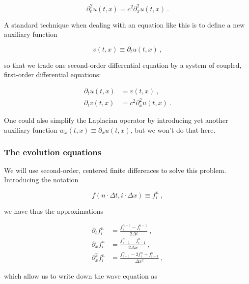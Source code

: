 \documentclass[a4paper,11pt]{article}
\begin{document}
\begin{equation}
\partial_{t}^{2}u(t,x) = c^{2}\partial_{x}^{2}u(t,x)\ .
\end{equation}

A standard technique when dealing with an equation like this is to define a new auxiliary function

\begin{equation}
v(t,x) \equiv \partial_{t}u(t,x)\ ,
\end{equation}

\noindent so that we trade one second-order differential equation by a system of coupled, first-order differential equations:

\begin{equation}
\begin{aligned}
\partial_{t}u(t,x) &= v(t,x)\ ,\\
\partial_{t}v(t,x) &= c^{2}\partial_{x}^{2}u(t,x)\ .
\end{aligned}
\end{equation}

\noindent One could also simplify the Laplacian operator by introducing yet another auxiliary function $w_{x}(t,x)\equiv\partial_{x}u(t,x)$, but we won't do that here.

\subsubsection{The evolution equations}

We will use second-order, centered finite differences to solve this problem. Introducing the notation

\begin{equation}
f\left(n\cdot\Delta t,i\cdot\Delta x\right) \equiv f^{n}_{i}\ ,
\end{equation}

\noindent we have thus the approximations

\begin{equation}
\begin{aligned}
\partial_{t}f^{n}_{i}     &= \frac{f^{n+1}_{i}-f^{n-1}_{i}}{2\Delta t}           \ ,\\
\partial_{x}f^{n}_{i}     &= \frac{f^{n}_{i+1}-f^{n}_{i-1}}{2\Delta x}           \ ,\\
\partial_{x}^{2}f^{n}_{i} &= \frac{f^{n}_{i+1}-2f^{n}_{i}+f^{n}_{i-1}}{\Delta x^{2}}\ ,
\end{aligned}
\end{equation}

\noindent which allow us to write down the wave equation as
\end{document}
